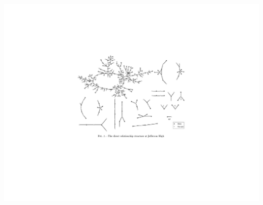 \documentclass{beamer}
\def\vf{\vfill}
\begin{document}
\begin{frame}

\begin{center}
\includegraphics[width=0.95\textheight]{figures/bearman_chains_2004_fig2}
\end{center}

\vf
{}

\end{frame}
\end{document}
